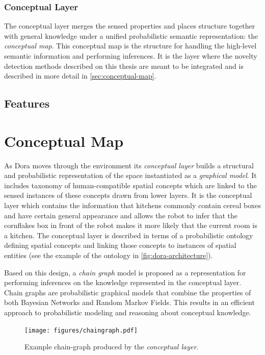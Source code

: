 \subsubsection*{Conceptual Layer}
The conceptual layer merges the sensed properties and places structure together
with general knowledge under a unified probabilistic semantic representation: the
\emph{conceptual map}.
This conceptual map is the structure for handling the high-level semantic information
and performing inferences. It is the layer where the novelty detection methods described
on this thesis are meant to be integrated and is described in more detail in
\autoref{sec:conceptual-map}.


\subsection{Features}
\label{sec:dora-features}


\section{Conceptual Map}
\label{sec:conceptual-map}
As \gls{Dora} moves through the environment its \emph{conceptual layer} builds a structural and
probabilistic representation of the space instantiated as a \emph{graphical model}.
It includes taxonomy of human\hyp{}compatible spatial concepts which are linked to the sensed 
instances of these concepts drawn from lower layers. It is the conceptual layer which 
contains the information that kitchens commonly contain cereal boxes and have certain 
general appearance and allows the robot to infer that the cornflakes box in front of the 
robot makes it more likely that the current room is a kitchen. The conceptual layer is 
described in terms of a probabilistic ontology defining spatial concepts and linking 
those concepts to instances of spatial entities (see the example of the ontology in
\autoref{fig:dora-architecture}).

Based on this design, a \emph{chain graph} model is proposed as a 
representation for performing inferences on the knowledge represented in the conceptual 
layer. Chain graphs are probabilistic graphical models that combine the properties of 
both Bayesian Networks and Random Markov Fields. This results in an efficient approach to 
probabilistic modeling and reasoning about conceptual knowledge.

\begin{figure}[h]
\centering
\texttt{[image: figures/chaingraph.pdf]}
\caption{\label{fig:chain-graph}Example chain-graph produced by the \emph{conceptual layer}.}
\end{figure}

